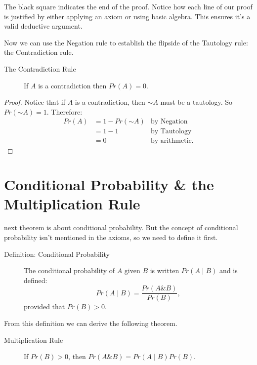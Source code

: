 \documentclass[justified]{tufte-book}
\newcommand{\given}{\mid}
\renewcommand{\neg}{\mathbin{\sim}}
\renewcommand{\wedge}{\mathbin{\&}}
\newcommand{\p}{Pr}
\theoremstyle{definition}
\theoremstyle{definition}
\theoremstyle{definition}
\theoremstyle{remark}
\let\BeginKnitrBlock\begin \let\EndKnitrBlock\end
\begin{document}
The black square indicates the end of the proof. Notice how each line of our proof is justified by either applying an axiom or using basic algebra. This ensures it's a valid deductive argument.

Now we can use the Negation rule to establish the flipside of the Tautology rule: the Contradiction rule.

\begin{description}
\item[The Contradiction Rule]
If \(A\) is a contradiction then \(\p(A) = 0\).
\end{description}

\BeginKnitrBlock{proof}
{}
Notice that if \(A\) is a contradiction, then \(\neg A\) must be a tautology. So \(\p(\neg A) = 1\). Therefore:
\[
  \begin{aligned}
  \p(A) &= 1 - \p(\neg A) & \mbox{by Negation}\\
        &= 1 - 1          & \mbox{by Tautology}\\
        &= 0              & \mbox{by arithmetic.}
  \end{aligned}
\]
\EndKnitrBlock{proof}

\hypertarget{conditional-probability-the-multiplication-rule}{%
\section*{Conditional Probability \& the Multiplication Rule}\label{conditional-probability-the-multiplication-rule}}

 next theorem is about conditional probability. But the concept of conditional probability isn't mentioned in the axioms, so we need to define it first.

\begin{description}
\item[Definition: Conditional Probability]
The conditional probability of \(A\) given \(B\) is written \(\p(A \given B)\) and is defined: \[\p(A \given B) = \frac{\p(A \wedge B)}{\p(B)},\] provided that \(\p(B) > 0\).
\end{description}

From this definition we can derive the following theorem.

\begin{description}
\item[Multiplication Rule]
If \(\p(B) > 0\), then \(\p(A \wedge B) = \p(A \given B)\p(B)\).
\end{description}
\end{document}
